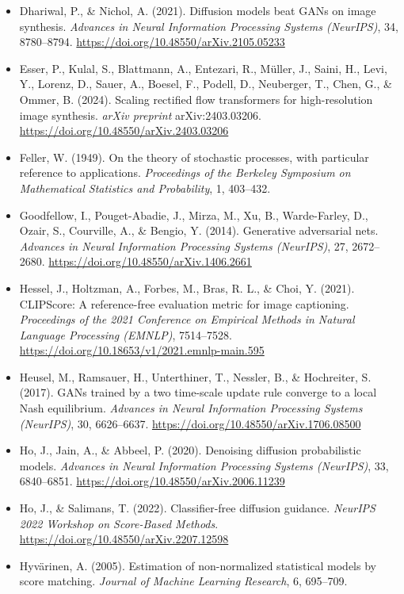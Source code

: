 \begin{itemize}[leftmargin=1.5em, label={}, itemsep=0.22ex, parsep=0pt]
    \item Dhariwal, P., \& Nichol, A. (2021). Diffusion models beat GANs on image synthesis. \textit{Advances in Neural Information Processing Systems (NeurIPS)}, 34, 8780--8794. \url{https://doi.org/10.48550/arXiv.2105.05233}
    \item Esser, P., Kulal, S., Blattmann, A., Entezari, R., Müller, J., Saini, H., Levi, Y., Lorenz, D., Sauer, A., Boesel, F., Podell, D., Neuberger, T., Chen, G., \& Ommer, B. (2024). Scaling rectified flow transformers for high-resolution image synthesis. \textit{arXiv preprint} arXiv:2403.03206. \url{https://doi.org/10.48550/arXiv.2403.03206}
    \item Feller, W. (1949). On the theory of stochastic processes, with particular reference to applications. \textit{Proceedings of the Berkeley Symposium on Mathematical Statistics and Probability}, 1, 403--432.
    \item Goodfellow, I., Pouget-Abadie, J., Mirza, M., Xu, B., Warde-Farley, D., Ozair, S., Courville, A., \& Bengio, Y. (2014). Generative adversarial nets. \textit{Advances in Neural Information Processing Systems (NeurIPS)}, 27, 2672--2680. \url{https://doi.org/10.48550/arXiv.1406.2661}
    \item Hessel, J., Holtzman, A., Forbes, M., Bras, R. L., \& Choi, Y. (2021). CLIPScore: A reference-free evaluation metric for image captioning. \textit{Proceedings of the 2021 Conference on Empirical Methods in Natural Language Processing (EMNLP)}, 7514--7528. \url{https://doi.org/10.18653/v1/2021.emnlp-main.595}
    \item Heusel, M., Ramsauer, H., Unterthiner, T., Nessler, B., \& Hochreiter, S. (2017). GANs trained by a two time-scale update rule converge to a local Nash equilibrium. \textit{Advances in Neural Information Processing Systems (NeurIPS)}, 30, 6626--6637. \url{https://doi.org/10.48550/arXiv.1706.08500}
    \item Ho, J., Jain, A., \& Abbeel, P. (2020). Denoising diffusion probabilistic models. \textit{Advances in Neural Information Processing Systems (NeurIPS)}, 33, 6840--6851. \url{https://doi.org/10.48550/arXiv.2006.11239}
    \item Ho, J., \& Salimans, T. (2022). Classifier-free diffusion guidance. \textit{NeurIPS 2022 Workshop on Score-Based Methods}. \url{https://doi.org/10.48550/arXiv.2207.12598}
    \item Hyvärinen, A. (2005). Estimation of non-normalized statistical models by score matching. \textit{Journal of Machine Learning Research}, 6, 695--709.

\end{itemize}
